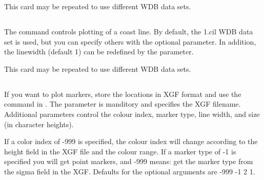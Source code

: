This card may be repeated to use different WDB data sets.

\subsection{}
The  command controls plotting of a coast line. By default,
the 1.cil WDB data set is used, but you can
specify others with the optional  parameter.
In addition, the linewidth (default 1) can be redefined by the
 parameter.

This card may be repeated to use different WDB data sets.

\subsection{}
If you want to plot markers, store the locations in XGF format and
use the  command in \PIM. The parameter 
is manditory and specifies the XGF filename. Additional parameters
 control the colour index, marker
type, line width, and size (in character heights).

If a color index of -999 is specified, the colour index will change
according to the height field in the XGF file and the colour range.
If a marker
type of -1 is specified you will get point markers, and -999 means:
get the marker type from the sigma field in the XGF.
Defaults for the optional arguments are -999 -1 2 1.


